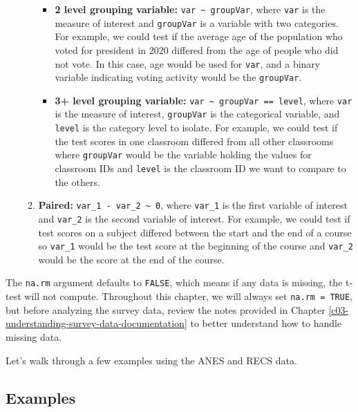 \documentclass[
]{krantz}
\providecommand{\tightlist}{%
  \setlength{\itemsep}{0pt}\setlength{\parskip}{0pt}}
\begin{document}
\begin{enumerate}
\begin{enumerate}
    \begin{itemize}
    \tightlist
    \item
      \textbf{2 level grouping variable:} \texttt{var\ \textasciitilde{}\ groupVar}, where \texttt{var} is the measure of interest and \texttt{groupVar} is a variable with two categories. For example, we could test if the average age of the population who voted for president in 2020 differed from the age of people who did not vote. In this case, age would be used for \texttt{var}, and a binary variable indicating voting activity would be the \texttt{groupVar}.
    \item
      \textbf{3+ level grouping variable:} \texttt{var\ \textasciitilde{}\ groupVar\ ==\ level}, where \texttt{var} is the measure of interest, \texttt{groupVar} is the categorical variable, and \texttt{level} is the category level to isolate. For example, we could test if the test scores in one classroom differed from all other classrooms where \texttt{groupVar} would be the variable holding the values for classroom IDs and \texttt{level} is the classroom ID we want to compare to the others.
    \end{itemize}
  \item
    \textbf{Paired:} \texttt{var\_1\ -\ var\_2\ \textasciitilde{}\ 0}, where \texttt{var\_1} is the first variable of interest and \texttt{var\_2} is the second variable of interest. For example, we could test if test scores on a subject differed between the start and the end of a course so \texttt{var\_1} would be the test score at the beginning of the course and \texttt{var\_2} would be the score at the end of the course.
  \end{enumerate}
\end{enumerate}

The \texttt{na.rm} argument defaults to \texttt{FALSE}, which means if any data is missing, the t-test will not compute. Throughout this chapter, we will always set \texttt{na.rm\ =\ TRUE}, but before analyzing the survey data, review the notes provided in Chapter \ref{c03-understanding-survey-data-documentation} to better understand how to handle missing data.

Let's walk through a few examples using the ANES and RECS data.

\hypertarget{stattest-ttest-examples}{%
\subsection{Examples}\label{stattest-ttest-examples}}
\end{document}
